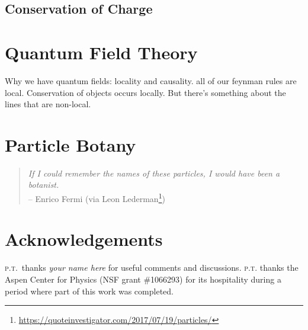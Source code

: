 \documentclass[12pt]{article}
\numberwithin{equation}{section}    %
\theoremstyle{definition}
\begin{document}
\subsection{Conservation of Charge}



\section{Quantum Field Theory}

Why we have quantum fields: locality and causality. all of our feynman rules are local. Conservation of objects occurs locally. But there's something about the lines that are non-local. 



\section{Particle Botany}

\begin{quote}
\emph{If I could remember the names of these particles, I would have been a botanist.}\\
	-- Enrico Fermi	(via Leon Lederman\footnote{\url{https://quoteinvestigator.com/2017/07/19/particles/}})
\end{quote}



\section*{Acknowledgements}


%
\textsc{p.t.}\ thanks 
\emph{your name here}
for useful comments and discussions. 
%
\textsc{p.t.} thanks the Aspen Center for Physics (NSF grant \#1066293) for its hospitality during a period where part of this work was completed.



% 
\end{document}
